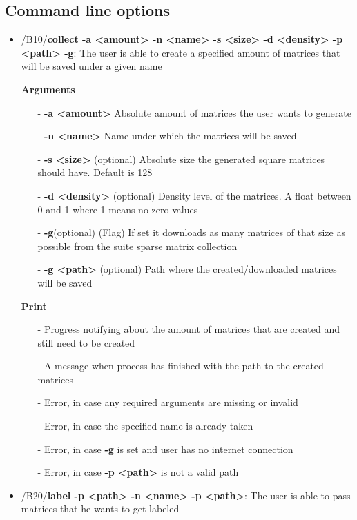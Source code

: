 \documentclass[parskip=full]{scrartcl}
\begin{document}
\subsection{Command line options}
\begin{itemize}
\item/B10/\textbf{collect -a <amount> -n <name> -s <size> -d <density> -p <path> -g}:
\newline The user is able to create a specified amount of matrices that will be saved under a given name

\textbf{Arguments}
	\begin{itemize}
	\item[-]\textbf{-a <amount>} Absolute amount of matrices the user wants to generate
	\item[-]\textbf{-n <name>} Name under which the matrices will be saved
	\item[-]\textbf{-s <size>} (optional) Absolute size the generated square matrices should have. Default is 128
	\item[-]\textbf{-d <density>} (optional) Density level of the matrices. A float between 0 and 1 where 1 means no zero values
	\item[-]\textbf{-g}(optional) (Flag) If set it downloads as many matrices of that size as possible from the suite sparse matrix collection
	\item[-]\textbf{-g <path>} (optional) Path where the created/downloaded matrices will be saved
	\end{itemize}

\textbf{Print}
	\begin{itemize}
	\item[-]Progress notifying about the amount of matrices that are created and still need to be created
	\item[-]A message when process has finished with the path to the created matrices
	\item[-]Error, in case any required arguments are missing or invalid
	\item[-]Error, in case the specified name is already taken
	\item[-]Error, in case \textbf{-g} is set and user has no internet connection
	\item[-]Error, in case \textbf{-p <path>} is not a valid path
	\end{itemize}

\item/B20/\textbf{label -p <path> -n <name> -p <path>}:
\newline The user is able to pass matrices that he wants to get labeled


\end{itemize}
\end{document}
